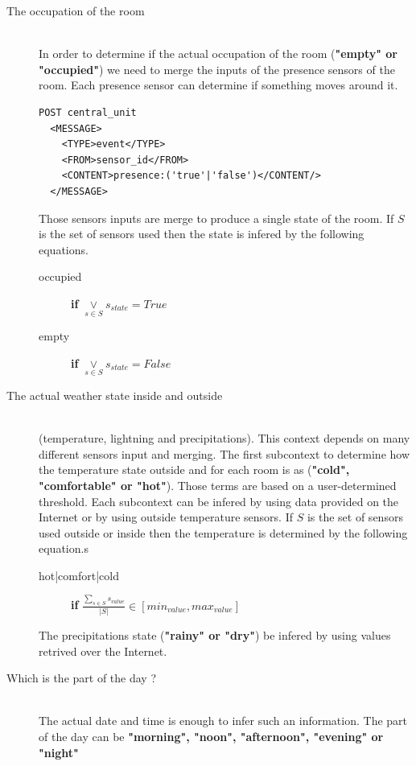 \documentclass{acm_proc_article-sp}
\begin{document}
\begin{description}
 \item[The occupation of the room]\hfill \\ 
 In order to determine if the actual occupation of the room (\textbf{"empty" or "occupied"}) we need to merge the inputs of the presence sensors of the room.
 Each presence sensor can determine if something moves around it.
 \begin{verbatim}
POST central_unit 
  <MESSAGE>
    <TYPE>event</TYPE>
    <FROM>sensor_id</FROM>
    <CONTENT>presence:('true'|'false')</CONTENT/>
  </MESSAGE> 
\end{verbatim}
Those sensors inputs are merge to produce a single state of the room.
If $S$ is the set of sensors used then the state is infered by the following equations.
 \begin{description}
  \item[occupied] \textbf{if} $\underset{s \in S}{\lor} s_{state} =  True$
  \item[empty] \textbf{if} $\underset{s \in S}{\lor} s_{state} =  False$
 \end{description}
 \item[The actual weather state inside and outside]\hfill \\
 (temperature, lightning and precipitations). 
 This context depends on many different sensors input and merging.
 The first subcontext to determine how the temperature state outside and for each room is as (\textbf{"cold", "comfortable" or "hot"}). 
 Those terms are based on a user-determined threshold.
 Each subcontext can be infered by using data provided on the Internet or by using outside temperature sensors.
 If $S$ is the set of sensors used outside or inside then the temperature is determined by the following equation.s
 \begin{description}
  \item[hot|comfort|cold] \textbf{if} $\frac{\underset{s \in S}{\sum} s_{value}}{|S|} \in [min_{value},max_{value}]$
 \end{description}
 The precipitations state (\textbf{"rainy" or "dry"}) be infered by using values retrived over the Internet.
  \item[Which is the part of the day ?] \hfill \\
  The actual date and time is enough to infer such an information.
  The part of the day can be \textbf{"morning", "noon", "afternoon", "evening" or "night"}

\end{description}
\end{document}

